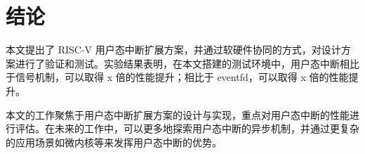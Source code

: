 
\chapter{结论}

本文提出了 RISC-V 用户态中断扩展方案，并通过软硬件协同的方式，对设计方案进行了验证和测试。实验结果表明，在本文搭建的测试环境中，用户态中断相比于信号机制，可以取得 x 倍的性能提升；相比于 eventfd，可以取得 x 倍的性能提升。

本文的工作聚焦于用户态中断扩展方案的设计与实现，重点对用户态中断的性能进行评估。在未来的工作中，可以更多地探索用户态中断的异步机制，并通过更复杂的应用场景如微内核等来发挥用户态中断的优势。